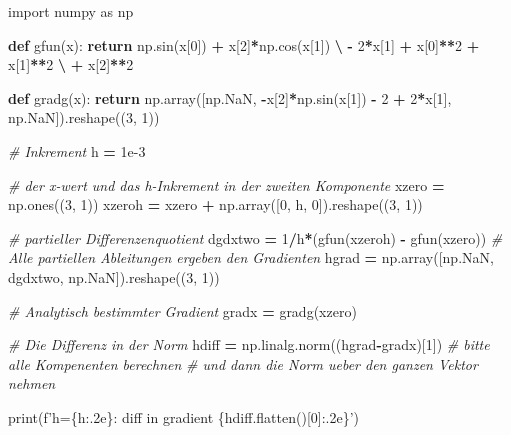\documentclass[]{book}
\newenvironment{Shaded}{\begin{snugshade}}{\end{snugshade}}
\newcommand{\BuiltInTok}[1]{#1}
\newcommand{\CommentTok}[1]{\textcolor[rgb]{0.56,0.35,0.01}{\textit{#1}}}
\newcommand{\ControlFlowTok}[1]{\textcolor[rgb]{0.13,0.29,0.53}{\textbf{#1}}}
\newcommand{\DecValTok}[1]{\textcolor[rgb]{0.00,0.00,0.81}{#1}}
\newcommand{\FloatTok}[1]{\textcolor[rgb]{0.00,0.00,0.81}{#1}}
\newcommand{\ImportTok}[1]{#1}
\newcommand{\KeywordTok}[1]{\textcolor[rgb]{0.13,0.29,0.53}{\textbf{#1}}}
\newcommand{\NormalTok}[1]{#1}
\newcommand{\OperatorTok}[1]{\textcolor[rgb]{0.81,0.36,0.00}{\textbf{#1}}}
\newcommand{\SpecialCharTok}[1]{\textcolor[rgb]{0.00,0.00,0.00}{#1}}
\newcommand{\SpecialStringTok}[1]{\textcolor[rgb]{0.31,0.60,0.02}{#1}}
\theoremstyle{definition}
\theoremstyle{definition}
\theoremstyle{definition}
\theoremstyle{definition}
\theoremstyle{remark}
\begin{document}
\begin{Shaded}
\begin{Highlighting}[]
\ImportTok{import}\NormalTok{ numpy }\ImportTok{as}\NormalTok{ np}
 
\KeywordTok{def}\NormalTok{ gfun(x):}
    \ControlFlowTok{return}\NormalTok{ np.sin(x[}\DecValTok{0}\NormalTok{]) }\OperatorTok{+}\NormalTok{ x[}\DecValTok{2}\NormalTok{]}\OperatorTok{*}\NormalTok{np.cos(x[}\DecValTok{1}\NormalTok{]) }\OperatorTok{\textbackslash{}}
        \OperatorTok{-} \DecValTok{2}\OperatorTok{*}\NormalTok{x[}\DecValTok{1}\NormalTok{] }\OperatorTok{+}\NormalTok{ x[}\DecValTok{0}\NormalTok{]}\OperatorTok{**}\DecValTok{2} \OperatorTok{+}\NormalTok{ x[}\DecValTok{1}\NormalTok{]}\OperatorTok{**}\DecValTok{2} \OperatorTok{\textbackslash{}}
        \OperatorTok{+}\NormalTok{ x[}\DecValTok{2}\NormalTok{]}\OperatorTok{**}\DecValTok{2}

\KeywordTok{def}\NormalTok{ gradg(x):}
    \ControlFlowTok{return}\NormalTok{ np.array([np.NaN,}
                     \OperatorTok{-}\NormalTok{x[}\DecValTok{2}\NormalTok{]}\OperatorTok{*}\NormalTok{np.sin(x[}\DecValTok{1}\NormalTok{]) }\OperatorTok{-} \DecValTok{2} \OperatorTok{+} \DecValTok{2}\OperatorTok{*}\NormalTok{x[}\DecValTok{1}\NormalTok{],}
\NormalTok{                     np.NaN]).reshape((}\DecValTok{3}\NormalTok{, }\DecValTok{1}\NormalTok{))}


\CommentTok{# Inkrement}
\NormalTok{h }\OperatorTok{=} \FloatTok{1e-3}

\CommentTok{# der x-wert und das h-Inkrement in der zweiten Komponente}
\NormalTok{xzero }\OperatorTok{=}\NormalTok{ np.ones((}\DecValTok{3}\NormalTok{, }\DecValTok{1}\NormalTok{))}
\NormalTok{xzeroh }\OperatorTok{=}\NormalTok{ xzero }\OperatorTok{+}\NormalTok{ np.array([}\DecValTok{0}\NormalTok{, h, }\DecValTok{0}\NormalTok{]).reshape((}\DecValTok{3}\NormalTok{, }\DecValTok{1}\NormalTok{))}

\CommentTok{# partieller Differenzenquotient}
\NormalTok{dgdxtwo }\OperatorTok{=} \DecValTok{1}\OperatorTok{/}\NormalTok{h}\OperatorTok{*}\NormalTok{(gfun(xzeroh) }\OperatorTok{-}\NormalTok{ gfun(xzero))}
\CommentTok{# Alle partiellen Ableitungen ergeben den Gradienten}
\NormalTok{hgrad }\OperatorTok{=}\NormalTok{ np.array([np.NaN, dgdxtwo, np.NaN]).reshape((}\DecValTok{3}\NormalTok{, }\DecValTok{1}\NormalTok{))}

\CommentTok{# Analytisch bestimmter Gradient}
\NormalTok{gradx }\OperatorTok{=}\NormalTok{ gradg(xzero)}

\CommentTok{# Die Differenz in der Norm}
\NormalTok{hdiff }\OperatorTok{=}\NormalTok{ np.linalg.norm((hgrad}\OperatorTok{-}\NormalTok{gradx)[}\DecValTok{1}\NormalTok{])}
\CommentTok{# bitte alle Kompenenten berechnen}
\CommentTok{# und dann die Norm ueber den ganzen Vektor nehmen}

\BuiltInTok{print}\NormalTok{(}\SpecialStringTok{f'h=}\SpecialCharTok{\{h:.2e\}}\SpecialStringTok{: diff in gradient }\SpecialCharTok{\{}\NormalTok{hdiff}\SpecialCharTok{.}\NormalTok{flatten()[}\DecValTok{0}\NormalTok{]}\SpecialCharTok{:.2e\}}\SpecialStringTok{'}\NormalTok{)}
\end{Highlighting}
\end{Shaded}
\end{document}
